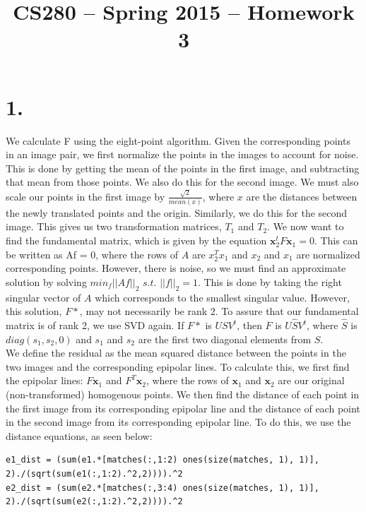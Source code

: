 \documentclass[11pt]{article}
\title{CS280 -- Spring 2015 -- Homework 3}
\author{\Name}
\begin{document}
\maketitle

\section*{1.} We calculate F using the eight-point algorithm. Given the corresponding points in an image pair, we first normalize the points in the images to account for noise. This is done by getting the mean of the points in the first image, and subtracting that mean from those points. We also do this for the second image. We must also scale our points in the first image by $\frac{\sqrt2}{mean(x)}$, where $x$ are the distances between the newly translated points and the origin. Similarly, we do this for the second image. This gives us two transformation matrices, $T_1$ and $T_2$. We now want to find the fundamental matrix, which is given by the equation $\textbf{x}_2^tF\textbf{x}_1 = 0$. This can be written as Af = 0, where the rows of $A$ are $x_2^T x_1$ and $x_2$ and $x_1$ are normalized corresponding points. However, there is noise, so we must find an approximate solution by solving $min_f ||Af||_2$ $s.t.$ $||f||_2 = 1$. This is done by taking the right singular vector of $A$ which corresponds to the smallest singular value. However, this solution, $F*$, may not necessarily be rank 2. To assure that our fundamental matrix is of rank 2, we use SVD again. If $F*$ is $USV^t$, then $F$ is $U\hat SV^t$, where $\hat S$ is $diag(s_1, s_2, 0)$ and $s_1$ and $s_2$ are the first two diagonal elements from $S$. \\ 
We define the residual as the mean squared distance between the points in the two images and the corresponding epipolar lines. To calculate this, we first find the epipolar lines: $F\textbf{x}_1$ and $F^T\textbf{x}_2$, where the rows of $\textbf{x}_1$ and  $\textbf{x}_2$ are our original (non-transformed) homogenous points. We then find the distance of each point in the first image from its corresponding epipolar line and the distance of each point in the second image from its corresponding epipolar line. To do this, we use the distance equations, as seen below: 
\begin{verbatim}
e1_dist = (sum(e1.*[matches(:,1:2) ones(size(matches, 1), 1)], 2)./(sqrt(sum(e1(:,1:2).^2,2)))).^2
e2_dist = (sum(e2.*[matches(:,3:4) ones(size(matches, 1), 1)], 2)./(sqrt(sum(e2(:,1:2).^2,2)))).^2
\end{verbatim}
\end{document}
